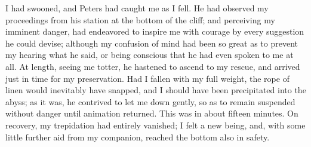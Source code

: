I had swooned, and Peters had caught me as I fell. He had observed my
proceedings from his station at the bottom of the cliff; and perceiving my
imminent danger, had endeavored to inspire me with courage by every suggestion
he could devise; although my confusion of mind had been so great as to prevent
my hearing what he said, or being conscious that he had even spoken to me at
all. At length, seeing me totter, he hastened to ascend to my rescue, and
arrived just in time for my preservation. Had I fallen with my full weight, the
rope of linen would inevitably have snapped, and I should have been precipitated
into the abyss; as it was, he contrived to let me down gently, so as to remain
suspended without danger until animation returned. This was in about fifteen
minutes. On recovery, my trepidation had entirely vanished; I felt a new being,
and, with some little further aid from my companion, reached the bottom also in
safety. 

